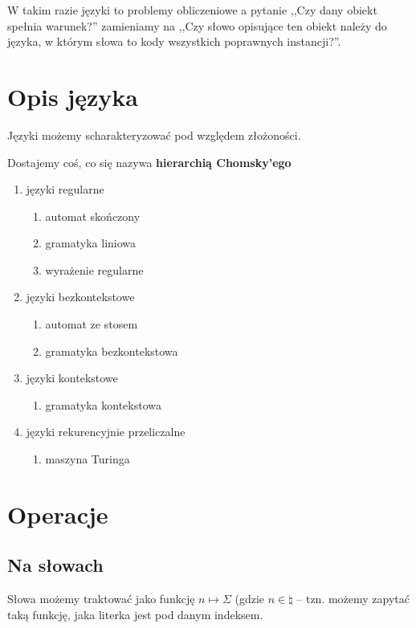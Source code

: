 W takim razie języki to problemy obliczeniowe a pytanie ,,Czy dany obiekt spełnia warunek?'' zamieniamy na ,,Czy słowo opisujące ten obiekt należy do języka, w którym słowa to kody wszystkich poprawnych instancji?''.

\section{Opis języka}
Języki możemy scharakteryzować pod względem złożoności.

Dostajemy coś, co się nazywa \textbf{hierarchią Chomsky'ego}
\begin{enumerate}
    \item języki regularne
    \begin{enumerate}
        \item automat skończony
        \item gramatyka liniowa
        \item wyrażenie regularne
    \end{enumerate}
    
    \item języki bezkontekstowe
    \begin{enumerate}
        \item automat ze stosem
        \item gramatyka bezkontekstowa
    \end{enumerate}
    
    \item języki kontekstowe
    \begin{enumerate}
        \item gramatyka kontekstowa
    \end{enumerate}
    
    \item języki rekurencyjnie przeliczalne
    \begin{enumerate}
        \item maszyna Turinga
    \end{enumerate}
\end{enumerate}

\section{Operacje}
\subsection{Na słowach}
Słowa możemy traktować jako funkcję \(n \mapsto \Sigma\) (gdzie \( n \in \natural \) -- tzn. możemy zapytać taką funkcję, jaka literka jest pod danym indeksem. 

